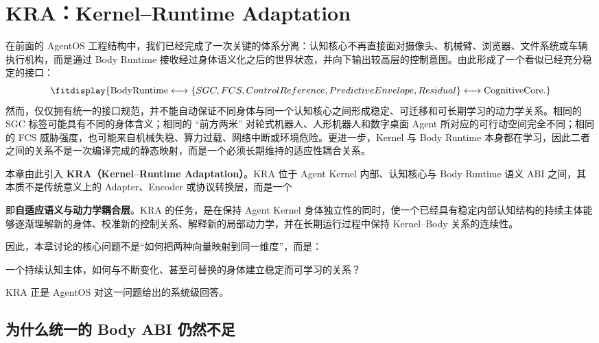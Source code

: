 \chapter{KRA：Kernel--Runtime Adaptation}
\label{chap:kra}

\begin{chapterlead}
在前面的 AgentOS 工程结构中，我们已经完成了一次关键的体系分离：认知核心不再直接面对摄像头、机械臂、浏览器、文件系统或车辆执行机构，而是通过 Body Runtime 接收经过身体语义化之后的世界状态，并向下输出较高层的控制意图。由此形成了一个看似已经充分稳定的接口：
\[
\fitdisplay{
\mathrm{BodyRuntime}
\longleftrightarrow
\{SGC,FCS,ControlReference,PredictiveEnvelope,Residual\}
\longleftrightarrow
\mathrm{CognitiveCore}.
}
\]
然而，仅仅拥有统一的接口规范，并不能自动保证不同身体与同一个认知核心之间形成稳定、可迁移和可长期学习的动力学关系。相同的 SGC 标签可能具有不同的身体含义；相同的 ``前方两米'' 对轮式机器人、人形机器人和数字桌面 Agent 所对应的可行动空间完全不同；相同的 FCS 威胁强度，也可能来自机械失稳、算力过载、网络中断或环境危险。更进一步，Kernel 与 Body Runtime 本身都在学习，因此二者之间的关系不是一次编译完成的静态映射，而是一个必须长期维持的适应性耦合关系。

本章由此引入 \textbf{KRA（Kernel--Runtime Adaptation）}。KRA 位于 Agent Kernel 内部、认知核心与 Body Runtime 语义 ABI 之间，其本质不是传统意义上的 Adapter、Encoder 或协议转换层，而是一个
\begin{statementbox}
\centering
{}
\end{statementbox}
即\textbf{自适应语义与动力学耦合层}。KRA 的任务，是在保持 Agent Kernel 身体独立性的同时，使一个已经具有稳定内部认知结构的持续主体能够逐渐理解新的身体、校准新的控制关系、解释新的局部动力学，并在长期运行过程中保持 Kernel--Body 关系的连续性。

因此，本章讨论的核心问题不是``如何把两种向量映射到同一维度''，而是：
\begin{statementbox}
一个持续认知主体，如何与不断变化、甚至可替换的身体建立稳定而可学习的关系？
\end{statementbox}
KRA 正是 AgentOS 对这一问题给出的系统级回答。
\end{chapterlead}

\section{为什么统一的 Body ABI 仍然不足}
\label{sec:kra-why-abi-insufficient}

